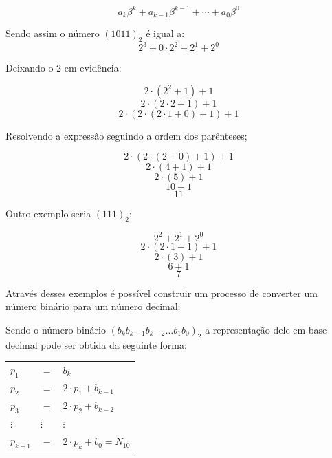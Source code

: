\documentclass{article}
\begin{document}
		\[a_k\beta^{k} + a_{k-1}\beta^{k-1} + \cdots + a_0\beta^0\]
		
		Sendo assim o número $(1011)_2$ é igual a:
		\[2^3 + 0\cdot 2^2 + 2^1 + 2^0\]
		
		Deixando o $2$ em evidência:
		
		\[2\cdot(2^2+1) + 1\]
		\[2\cdot(2\cdot 2 +1) + 1\]
		\[2\cdot(2\cdot(2\cdot1+0)+1)+1\]
		
		Resolvendo a expressão seguindo a ordem dos parênteses; 
		
		\[2\cdot(2\cdot(2+0)+1)+1\]
		\[2\cdot(4+1)+1\]
		\[2\cdot(5)+1\]
		\[10+1\]
		\[11\]
		
		Outro exemplo seria $(111)_2$:
		
		\[2^2+2^1+2^0\]
		\[2\cdot(2\cdot 1+1)+1\]
		\[2\cdot(3)+1\]
		\[6+1\]
		\[7\]
		
		Através desses exemplos é possível construir um processo de converter um número binário para um número decimal:
		
		Sendo o número binário $(b_kb_{k-1}b_{k-2}\dots b_1b_0)_2$ a representação dele em base decimal pode ser obtida da seguinte forma:
		
		\begin{center}
			\begin{tabular}{lll}
				$p_1$ &$=$& $b_k$\\
				$p_2$&$=$&$2\cdot p_1+b_{k-1}$\\
				$p_3$&$=$&$2\cdot p_2 + b_{k-2}$\\
				$\vdots$&$\vdots$&$\vdots$\\
				$p_{k+1}$&$=$&$2\cdot p_k + b_0 = N_{10} $
			\end{tabular}
		\end{center}
		
		
	
	
\end{document}
